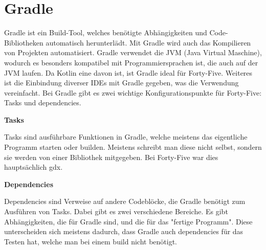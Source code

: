 
\renewcommand{\kapitelautor}{Autor: Felix Zwickelstorfer}
\section{Gradle}\label{sec:gradle}

\renewcommand{\kapitelautor}{Autor: Felix Zwickelstorfer}

Gradle ist ein Build-Tool, welches benötigte Abhängigkeiten und Code-Bibliotheken automatisch herunterlädt.
Mit Gradle wird auch das Kompilieren von Projekten automatisiert.
Gradle verwendet die JVM (Java Virtual Maschine), wodurch es besonders kompatibel mit Programmiersprachen ist, die auch auf der JVM laufen.
Da Kotlin eine davon ist, ist Gradle ideal für Forty-Five.
Weiteres ist die Einbindung diverser IDEs mit Gradle gegeben, was die Verwendung vereinfacht.
Bei Gradle gibt es zwei wichtige Konfigurationspunkte für Forty-Five: Tasks und dependencies.

\textbf{Tasks}

Tasks sind ausführbare Funktionen in Gradle, welche meistens das eigentliche Programm starten oder builden.
Meistens schreibt man diese nicht selbst, sondern sie werden von einer Bibliothek mitgegeben.
Bei Forty-Five war dies hauptsächlich gdx.

\textbf{Dependencies}

Dependencies sind Verweise auf andere Codeblöcke, die Gradle benötigt zum Ausführen von Tasks.
Dabei gibt es zwei verschiedene Bereiche.
Es gibt Abhängigkeiten, die für Gradle sind, und die für das "fertige Programm".
Diese unterscheiden sich meistens dadurch, dass Gradle auch dependencies für das Testen hat, welche man bei einem build nicht benötigt.


